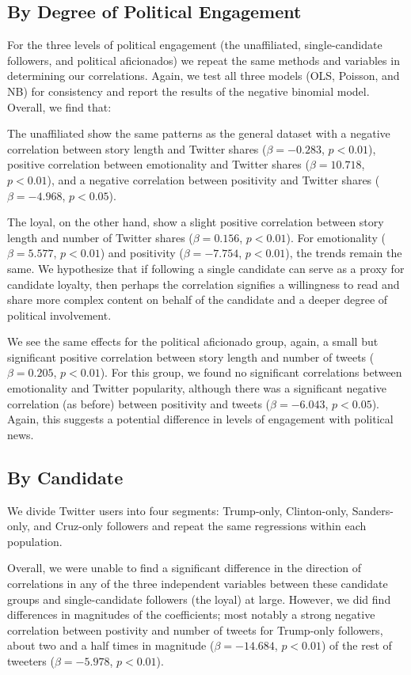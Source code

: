\documentclass[letterpaper]{article}
\begin{document}
\subsection{By Degree of Political Engagement}
For the three levels of political engagement (the unaffiliated, single-candidate followers, and political aficionados) we repeat the same methods and variables in determining our correlations. Again, we test all three models (OLS, Poisson, and NB) for consistency and report the results of the negative binomial model. Overall, we find that: 

The unaffiliated show the same patterns as the general dataset with a negative correlation between story length and Twitter shares ($\beta=-0.283$, $p<0.01$), positive correlation between emotionality and Twitter shares ($\beta=10.718$, $p<0.01$), and a negative correlation between positivity and Twitter shares ($\beta=-4.968$, $p<0.05$).

The loyal, on the other hand, show a slight positive correlation between story length and number of Twitter shares ($\beta=0.156$, $p<0.01$). For emotionality ($\beta=5.577$, $p<0.01$) and positivity ($\beta=-7.754$, $p<0.01$), the trends remain the same. We hypothesize that if following a single candidate can serve as a proxy for candidate loyalty, then perhaps the correlation signifies a willingness to read and share more complex content on behalf of the candidate and a deeper degree of political involvement.

We see the same effects for the political aficionado group, again, a small but significant positive correlation between story length and number of tweets ($\beta=0.205$, $p<0.01$). For this group, we found no significant correlations between emotionality and Twitter popularity, although there was a significant negative correlation (as before) between positivity and tweets ($\beta=-6.043$, $p<0.05$). Again, this suggests a potential difference in levels of engagement with political news. 

\subsection{By Candidate} 
We divide Twitter users into four segments: Trump-only, Clinton-only, Sanders-only, and Cruz-only followers and repeat the same regressions within each population. 

Overall, we were unable to find a significant difference in the direction of correlations in any of the three independent variables between these candidate groups and single-candidate followers (the loyal) at large. However, we did find differences in magnitudes of the coefficients; most notably a strong negative correlation between postivity and number of tweets for Trump-only followers, about two and a half times in magnitude ($\beta=-14.684$, $p<0.01$) of the rest of tweeters ($\beta=−5.978$, $p<0.01$). 
\end{document}
